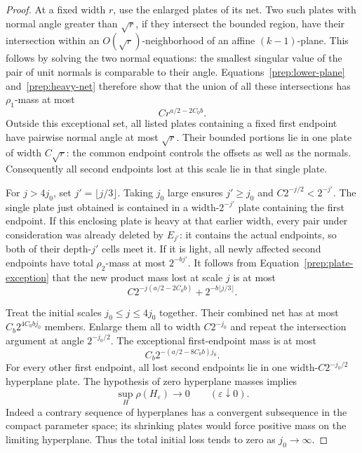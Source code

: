 \begin{proof}
At a fixed width $r$, use the enlarged plates of its net. Two such
plates with normal angle greater than $\sqrt r$, if they intersect
the bounded region, have their intersection within an
$O(\sqrt r)$-neighborhood of an affine $(k-1)$-plane.
This follows by solving the two normal equations: the smallest
singular value of the pair of unit normals is comparable to their
angle. Equations~\eqref{prep:lower-plane} and~\eqref{prep:heavy-net}
therefore show that the union of all these intersections has
$\rho_1$-mass at most
\begin{equation}\label{prep:plate-exception}
 C r^{a/2-2C_0b}.
\end{equation}
Outside this exceptional set, all listed plates containing a fixed
first endpoint have pairwise normal angle at most $\sqrt r$.
Their bounded portions lie in one plate of width $C\sqrt r$:
the common endpoint controls the offsets as well as the normals.
Consequently all second endpoints lost at this scale lie in that
single plate.

For $j>4j_0$, set $j'=\lfloor j/3\rfloor$.
Taking $j_0$ large ensures $j'\ge j_0$ and
$C2^{-j/2}<2^{-j'}$. The single plate just obtained is contained
in a width-$2^{-j'}$ plate containing the first endpoint.
If this enclosing plate is heavy at that earlier width, every pair
under consideration was already deleted by $E_{j'}$: it contains
the actual endpoints, so both of their depth-$j'$ cells meet it.
If it is light, all newly affected second endpoints have total
$\rho_2$-mass at most $2^{-bj'}$. It follows from
Equation~\eqref{prep:plate-exception} that the new product mass
lost at scale $j$ is at most
\begin{equation}\label{prep:late-loss}
 C2^{-j(a/2-2C_0b)}+2^{-b\lfloor j/3\rfloor}.
\end{equation}

Treat the initial scales $j_0\le j\le4j_0$ together.
Their combined net has at most $C_b2^{4C_0bj_0}$ members.
Enlarge them all to width $C2^{-j_0}$ and repeat the intersection
argument at angle $2^{-j_0/2}$. The exceptional first-endpoint
mass is at most
\[
 C_b2^{-(a/2-8C_0b)j_0}.
\]
For every other first endpoint, all lost second endpoints lie in
one width-$C2^{-j_0/2}$ hyperplane plate.
The hypothesis of zero hyperplane masses implies
\begin{equation}\label{prep:uniform-vanishing}
 \sup_H\rho(H_\varepsilon)\longrightarrow0
       \qquad(\varepsilon\downarrow0).
\end{equation}
Indeed a contrary sequence of hyperplanes has a convergent subsequence
in the compact parameter space; its shrinking plates would force
positive mass on the limiting hyperplane. Thus the total initial
loss tends to zero as $j_0\to\infty$.


\end{proof}
